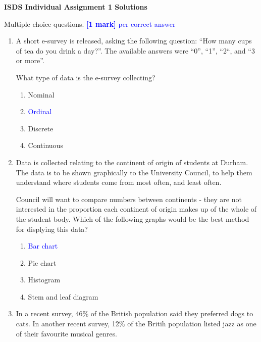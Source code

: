 \documentclass[11pt,a4paper]{article}
\begin{document}

\setcounter{section}{1}



\textbf{ISDS Individual Assignment 1 Solutions}


\vspace{0.2cm}

\begin{question}
Multiple choice questions. \textcolor{blue}{\textbf{[1 mark]} per correct answer}
\begin{enumerate}
\item A short e-survey is released, asking the following question: ``How many cups of tea do you drink a day?''. The available answers were ``0'', ``1'', ``2``, and ``3 or more''.

What type of data is the e-survey collecting?

\begin{enumerate}
\item Nominal
\item \textcolor{blue}{Ordinal}
\item Discrete
\item Continuous
\end{enumerate}




\item Data is collected relating to the continent of origin of students at Durham. The data is to be shown graphically to the University Council, to help them understand where students come from most often, and least often.

Council will want to compare numbers between continents - they are not interested in the proportion each continent of origin makes up of the whole of the student body. Which of the following graphs would be the best method for displying this data?

\begin{enumerate}
\item \textcolor{blue}{Bar chart}
\item Pie chart
\item Histogram
\item Stem and leaf diagram
\end{enumerate}



\item In a recent survey, 46\% of the British population said they preferred dogs to cats. In another recent survey, 12\% of the Britih population listed jazz as one of their favourite musical genres.


\end{enumerate}
\end{question}
\end{document}
